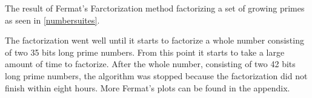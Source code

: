 The result of Fermat's Farctorization method factorizing a set of growing primes as seen in \ref{numbersuites}.



The factorization went well until it starts to factorize a whole number consisting of two 35 bits long prime numbers. From this point it starts to take a large amount of time to factorize. After the whole number, consisting of two 42 bits long prime numbers, the algorithm was stopped because the factorization did not finish within eight hours. 
More Fermat's plots can be found in the appendix.